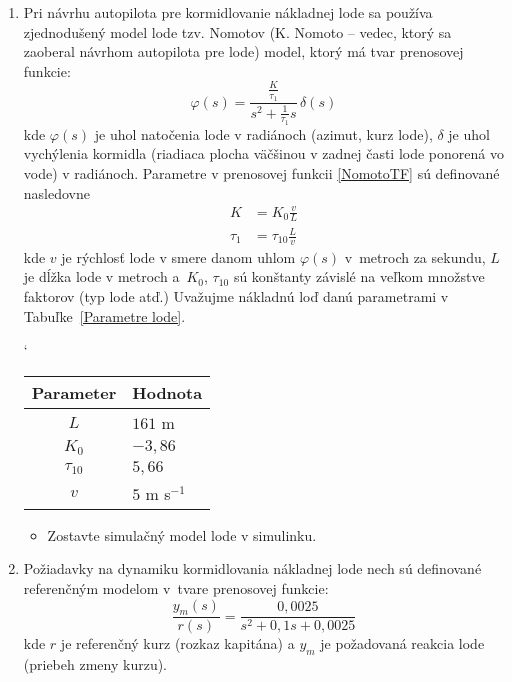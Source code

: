 \documentclass[a4paper, 10pt, ]{article}
\begin{document}
\begin{enumerate}[leftmargin=0pt, labelsep=4mm, itemsep=0pt]

	\item  Pri návrhu autopilota pre kormidlovanie nákladnej lode sa používa zjednodušený model lode tzv. Nomotov (K. Nomoto -- vedec, ktorý sa zaoberal návrhom autopilota pre lode) model, ktorý má tvar prenosovej funkcie:
	\begin{equation} \label{NomotoTF}
		\varphi(s) = \frac{\frac{K}{\tau_1}}{s^2 + \frac{1}{\tau_1}s} \, \delta(s)
	\end{equation}
	kde $\varphi(s)$ je uhol natočenia lode v radiánoch (azimut, kurz lode), $\delta$ je uhol vychýlenia kormidla (riadiaca plocha väčšinou v zadnej časti lode ponorená vo vode) v radiánoch. Parametre v prenosovej funkcii \eqref{NomotoTF} sú definované nasledovne
	\begin{align}
		K &= K_0 \frac{v}{L} \\
		\tau_1 &= \tau_{10} \frac{L}{v}
	\end{align}
	kde $v$ je rýchlosť lode v smere danom uhlom $\varphi(s)$ v~metroch za sekundu, $L$ je dĺžka lode v metroch a~$K_0$, $\tau_{10}$ sú konštanty závislé na veľkom množstve faktorov (typ lode atď.) Uvažujme nákladnú loď danú parametrami v Tabuľke~\ref{Parametre lode}.

	\begin{center}
		\catcode`
		\label{Parametre lode}
		\begin{tabular}{ c l }
			\toprule
			Parameter & Hodnota \\
			\midrule
			$L$         & $161$ m \\
			$K_0$       &  $-3,86$ \\
			$\tau_{10}$ & $5,66$ \\
			$v$         &  $5$ m s$^{-1}$ \\
			\bottomrule
		\end{tabular}
	\end{center}



	\begin{itemize}[leftmargin=0pt, labelsep=4mm, itemsep=0pt]
		\item Zostavte simulačný model lode v simulinku.
	\end{itemize}

	\item Požiadavky na dynamiku kormidlovania nákladnej lode nech sú definované referenčným modelom v~tvare prenosovej funkcie:
	\begin{equation}
		\frac{y_m(s)}{r(s)} = \frac{0,0025 }{s^2 + 0,1 s + 0,0025}
	\end{equation}
	kde $r$ je referenčný kurz (rozkaz kapitána) a $y_m$ je požadovaná reakcia lode (priebeh zmeny kurzu).


\end{enumerate}
\end{document}
